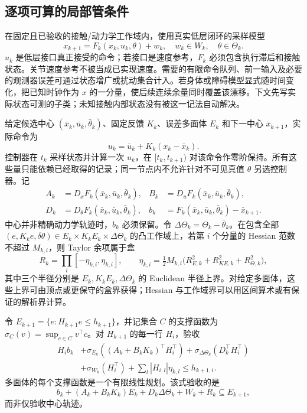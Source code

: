 \documentclass[UTF8,fontset=fandol,zihao=5,a4paper]{ctexart}
\theoremstyle{definition}
\theoremstyle{remark}\newtheorem{remark}[theorem]{说明}
\numberwithin{equation}{section}
\begin{document}
\subsection{逐项可算的局部管条件}

在固定且已验收的接触/动力学工作域内，使用真实低层闭环的采样模型
\begin{equation}
x_{k+1}=F_k(x_k,u_k,\theta)+w_k,
\quad w_k\in W_k,
\quad\theta\in\Theta_k.
\label{eq:physical-discrete}
\end{equation}
\(u_k\) 是低层接口真正接受的命令；若接口是速度参考，\(F_k\) 必须包含执行滞后和接触状态。关节速度参考不被当成已实现速度。需要的有限命令队列、前一输入及必要的观测器误差可通过状态增广或扰动集合计入。若身体或障碍模型显式随时间变化，把已知时钟作为 \(x\) 的一分量，使后续连续余量同时覆盖该漂移。下文先写实际状态可测的子类；未知接触内部状态没有被这一记法自动解决。

给定候选中心 \((\bar x_k,\bar u_k,\bar\theta_k)\)、固定反馈 \(K_k\)、误差多面体 \(E_k\) 和下一中心 \(\bar x_{k+1}\)，实际命令为
\begin{equation}
u_k=\bar u_k+K_k(x_k-\bar x_k).
\label{eq:tube-feedback}
\end{equation}
控制器在 \(t_k\) 采样状态并计算一次 \(u_k\)，在 \([t_k,t_{k+1})\) 对该命令作零阶保持。所有这些量只能依赖已经取得的记录；同一节点内不允许针对不可见真值 \(\theta\) 另选控制器。记
\begin{align}
A_k&=D_xF_k(\bar x_k,\bar u_k,\bar\theta_k),&
B_k&=D_uF_k(\bar x_k,\bar u_k,\bar\theta_k),\\
D_k&=D_\theta F_k(\bar x_k,\bar u_k,\bar\theta_k),&
b_k&=F_k(\bar x_k,\bar u_k,\bar\theta_k)-\bar x_{k+1}.
\end{align}
中心并非精确动力学轨迹时，\(b_k\) 必须保留。令 \(\Delta\Theta_k=\Theta_k-\bar\theta_k\)。在包含全部
\((e,K_ke,\delta\theta)\in E_k\times K_kE_k\times\Delta\Theta_k\)
的凸工作域上，若第 \(i\) 个分量的 Hessian 范数不超过 \(M_{k,i}\)，则 Taylor 余项属于盒
\begin{equation}
R_k=\prod_i[-\eta_{k,i},\eta_{k,i}],\qquad
\eta_{k,i}=\tfrac12 M_{k,i}
\bigl(R_{E,k}^2+R_{KE,k}^2+R_{\Theta,k}^2\bigr),
\label{eq:remainder-box}
\end{equation}
其中三个半径分别是 \(E_k,K_kE_k,\Delta\Theta_k\) 的 Euclidean 半径上界。对给定多面体，这些上界可由顶点或更保守的盒界获得；Hessian 与工作域界可以用区间算术或有保证的解析界计算。

令 \(E_{k+1}=\{e:H_{k+1}e\le h_{k+1}\}\)，并记集合 \(C\) 的支撑函数为 \(\sigma_C(v)=\sup_{c\in C}v^\top c\)。对 \(H_{k+1}\) 的每一行 \(H_i\)，验收
\begin{align}
H_i b_k
&+\sigma_{E_k}\!\left((A_k+B_kK_k)^\top H_i^\top\right)
+\sigma_{\Delta\Theta_k}(D_k^\top H_i^\top)\nonumber\\
&+\sigma_{W_k}(H_i^\top)
+\sum_l |H_{i,l}|\eta_{k,l}
\le h_{k+1,i}.
\label{eq:tube-support}
\end{align}
多面体的每个支撑函数是一个有限线性规划。该式验收的是
\[
b_k+(A_k+B_kK_k)E_k+D_k\Delta\Theta_k+W_k+R_k\subseteq E_{k+1},
\]
而非仅验收中心轨迹。
\end{document}
